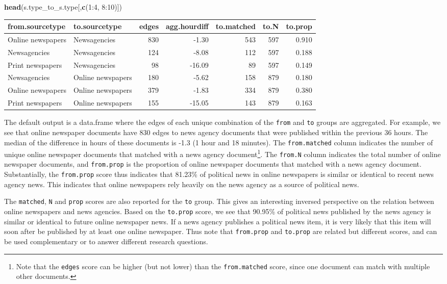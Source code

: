 \documentclass[]{article}
\newenvironment{Shaded}{\begin{snugshade}}{\end{snugshade}}
\newcommand{\KeywordTok}[1]{\textcolor[rgb]{0.13,0.29,0.53}{\textbf{{#1}}}}
\newcommand{\DecValTok}[1]{\textcolor[rgb]{0.00,0.00,0.81}{{#1}}}
\newcommand{\NormalTok}[1]{{#1}}
\let\rmarkdownfootnote\footnote%
\def\footnote{\protect\rmarkdownfootnote}
\begin{document}
\begin{Shaded}
\begin{Highlighting}[]
\KeywordTok{head}\NormalTok{(s.type_to_s.type[,}\KeywordTok{c}\NormalTok{(}\DecValTok{1}\NormalTok{:}\DecValTok{4}\NormalTok{, }\DecValTok{8}\NormalTok{:}\DecValTok{10}\NormalTok{)])}
\end{Highlighting}
\end{Shaded}

\begin{longtable}[c]{@{}llrrrrr@{}}
\toprule
from.sourcetype & to.sourcetype & edges & agg.hourdiff & to.matched &
to.N & to.prop\tabularnewline
\midrule
\endhead
Online newspapers & Newsagencies & 830 & -1.30 & 543 & 597 &
0.910\tabularnewline
Newsagencies & Newsagencies & 124 & -8.08 & 112 & 597 &
0.188\tabularnewline
Print newspapers & Newsagencies & 98 & -16.09 & 89 & 597 &
0.149\tabularnewline
Newsagencies & Online newspapers & 180 & -5.62 & 158 & 879 &
0.180\tabularnewline
Online newspapers & Online newspapers & 379 & -1.83 & 334 & 879 &
0.380\tabularnewline
Print newspapers & Online newspapers & 155 & -15.05 & 143 & 879 &
0.163\tabularnewline
\bottomrule
\end{longtable}

The default output is a data.frame where the edges of each unique
combination of the \texttt{from} and \texttt{to} groups are aggregated.
For example, we see that online newspaper documents have 830 edges to
news agency documents that were published within the previous 36 hours.
The median of the difference in hours of these documents is -1.3 (1 hour
and 18 minutes). The \texttt{from.matched} column indicates the number
of unique online newspaper documents that matched with a news agency
document\footnote{Note that the \texttt{edges} score can be higher (but
  not lower) than the \texttt{from.matched} score, since one document
  can match with multiple other documents.}. The \texttt{from.N} column
indicates the total number of online newspaper documents, and
\texttt{from.prop} is the proportion of online newspaper documents that
matched with a news agency document. Substantially, the
\texttt{from.prop} score thus indicates that 81.23\% of political news
in online newspapers is similar or identical to recent news agency news.
This indicates that online newspapers rely heavily on the news agency as
a source of political news.

The \texttt{matched}, \texttt{N} and \texttt{prop} scores are also
reported for the \texttt{to} group. This gives an interesting inversed
perspective on the relation between online newspapers and news agencies.
Based on the \texttt{to.prop} score, we see that 90.95\% of political
news published by the news agency is similar or identical to future
online newspaper news. If a news agency publishes a political news item,
it is very likely that this item will soon after be published by at
least one online newspaper. Thus note that \texttt{from.prop} and
\texttt{to.prop} are related but different scores, and can be used
complementary or to answer different research questions.
\end{document}
